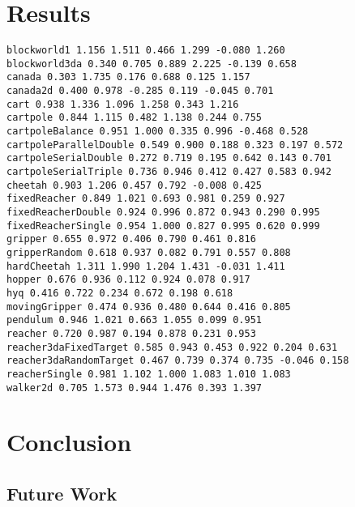 \documentclass{article} %
\numberwithin{equation}{subsection}
\numberwithin{theorem}{subsection}
\theoremstyle{named}
\begin{document}




\section{Results}


\begin{verbatim}
blockworld1 1.156 1.511 0.466 1.299 -0.080 1.260
blockworld3da 0.340 0.705 0.889 2.225 -0.139 0.658
canada 0.303 1.735 0.176 0.688 0.125 1.157
canada2d 0.400 0.978 -0.285 0.119 -0.045 0.701
cart 0.938 1.336 1.096 1.258 0.343 1.216
cartpole 0.844 1.115 0.482 1.138 0.244 0.755
cartpoleBalance 0.951 1.000 0.335 0.996 -0.468 0.528
cartpoleParallelDouble 0.549 0.900 0.188 0.323 0.197 0.572
cartpoleSerialDouble 0.272 0.719 0.195 0.642 0.143 0.701
cartpoleSerialTriple 0.736 0.946 0.412 0.427 0.583 0.942
cheetah 0.903 1.206 0.457 0.792 -0.008 0.425
fixedReacher 0.849 1.021 0.693 0.981 0.259 0.927
fixedReacherDouble 0.924 0.996 0.872 0.943 0.290 0.995
fixedReacherSingle 0.954 1.000 0.827 0.995 0.620 0.999
gripper 0.655 0.972 0.406 0.790 0.461 0.816
gripperRandom 0.618 0.937 0.082 0.791 0.557 0.808
hardCheetah 1.311 1.990 1.204 1.431 -0.031 1.411
hopper 0.676 0.936 0.112 0.924 0.078 0.917
hyq 0.416 0.722 0.234 0.672 0.198 0.618
movingGripper 0.474 0.936 0.480 0.644 0.416 0.805
pendulum 0.946 1.021 0.663 1.055 0.099 0.951
reacher 0.720 0.987 0.194 0.878 0.231 0.953
reacher3daFixedTarget 0.585 0.943 0.453 0.922 0.204 0.631
reacher3daRandomTarget 0.467 0.739 0.374 0.735 -0.046 0.158
reacherSingle 0.981 1.102 1.000 1.083 1.010 1.083
walker2d 0.705 1.573 0.944 1.476 0.393 1.397
\end{verbatim}



\section{Conclusion}
\subsection{Future Work}





%
\end{document}
